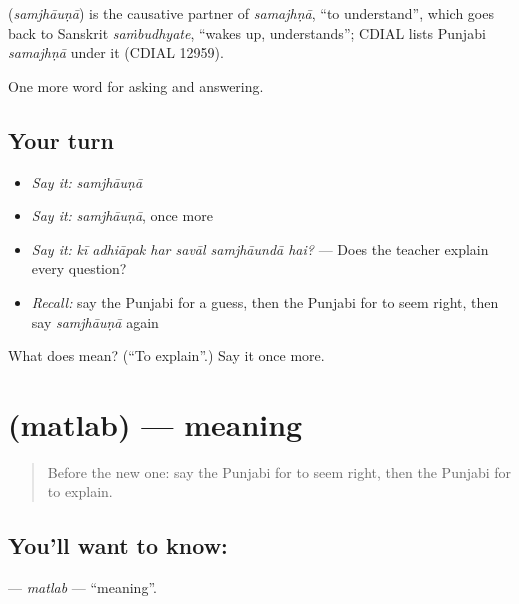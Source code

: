 \begin{cousinweb}
\textbf{} (\emph{samjhāuṇā}) is the causative partner of \emph{samajhṇā}, \textquotedblleft{}to understand\textquotedblright{}, which goes back to Sanskrit \emph{saṁbudhyate}, \textquotedblleft{}wakes up, understands\textquotedblright{}; CDIAL lists Punjabi \emph{samajhṇā} under it (CDIAL 12959).
\end{cousinweb}

\begin{grammarlens}[title={What you've built}]
One more word for asking and answering.
\end{grammarlens}

\subsection*{Your turn}
\begin{itemize}
\raggedright
  \item \emph{Say it:} \emph{samjhāuṇā}
  \item \emph{Say it:} \emph{samjhāuṇā}, once more
  \item \emph{Say it:} \emph{kī adhiāpak har savāl samjhāundā hai?} — Does the teacher explain every question?
  \item \emph{Recall:} say the Punjabi for a guess, then the Punjabi for to seem right, then say \emph{samjhāuṇā} again
\end{itemize}

\begin{tcolorbox}[breakable,colback=teal!4,colframe=teal!35!black,title={Before you move on}]
What does  mean? (\textquotedblleft{}To explain\textquotedblright{}.) Say it once more.
\end{tcolorbox}
\section[\texorpdfstring{\pa{ਮਤਲਬ} (matlab)}{ਮਤਲਬ (matlab)}]{ (matlab) — meaning}

\label{lesson:PA-C342-matlab}



\begin{quote}
Before the new one: say the Punjabi for to seem right, then the Punjabi for to explain.
\end{quote}

\subsection*{You'll want to know: }
\textbf{} — \emph{matlab} — \textquotedblleft{}meaning\textquotedblright{}.

